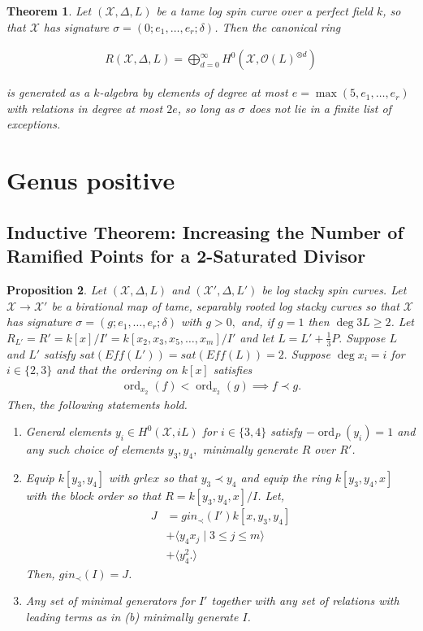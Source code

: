 \documentclass{amsart}
\theoremstyle{plain}
\newtheorem{thm}{Theorem}[section]
\newtheorem{prop}[thm]{Proposition}
\theoremstyle{definition}
\theoremstyle{remark}
\numberwithin{equation}{section}
\newcommand\ssec{\subsection}
\newcommand \sx{\mathscr X}
\newcommand\sco{{\mathscr O}}
\DeclareMathOperator{\ord}{ord}
\begin{document}
\begin{thm}
\label{thm:g_0_generators_relations_rep}
Let $(\sx, \Delta, L)$ be a tame log spin curve over a perfect field $k$, so
that $\sx$ has signature $\sigma = (0; e_1, \ldots, e_r; \delta)$. Then the
canonical ring

\begin{align*}
	R(\sx, \Delta, L) = \bigoplus_{d = 0}^\infty H^0(\sx, \sco(L)^{\otimes d})
\end{align*}

\noindent
is generated as a $k$-algebra by elements of degree at most $e = 
\max(5,e_1,\ldots, e_r)$ with relations in degree at most $2e$, so 
long as $\sigma$ does not lie in a finite list of exceptions. 
\end{thm}

\section{Genus positive}

\ssec{Inductive Theorem: Increasing the Number of Ramified Points for a 2-Saturated Divisor}

\begin{prop}
\label{prop:sat_two_induction}
Let $(\sx, \Delta, L)$ and $(\sx', \Delta, L')$ be log stacky spin curves. Let $\sx \rightarrow \sx'$ be a birational map of tame, separably rooted log stacky curves so that $\sx$ has signature $\sigma = (g;e_1,\ldots, e_r;\delta)$ with $g > 0,$ and, if $g = 1$ then $\deg 3L \geq 2$.
Let $R_{L'} = R' = k[x]/I'= k[x_2, x_3
, x_5,\ldots, x_m]/I'$ and let $L = L' + \frac{1}{
3}P.$ Suppose $L$ and $L'$ satisfy $sat(Eff(L')) = sat(Eff(L)) = 2.$ Suppose $\deg x_i = i$ for $i \in \{2, 3\}$ and that the ordering on $k[x]$ satisfies
\begin{align*}
	\ord_{x_2}(f) < \ord_{x_2}(g) \implies f \prec g.
\end{align*}
Then, the following statements hold.
\begin{enumerate}
	\item[(a)] General elements  $y_i \in H^0(\sx,iL)$ for $i \in \{3, 4\}$ satisfy $-\ord_P(y_i) = 1$ and any such choice of elements $y
		_3,y_4,$ minimally generate $R$ over $R'$.
	\item[(b)] Equip $k[y_3, y_4]$ with $grlex$ so that $y_3 \prec 
		y_4$
		and equip the ring $k[y_3, y_4, x]$ with the block 
		order so that $R = k[y_3, y_4, x]/I$. Let,
		\begin{align*}
			J &= gin_\prec(I')k[x, y_3, y_4] \\
			&+\langle y_4 x_j \mid 3 \leq j \leq m \rangle \\
			&+\langle y_4^2.\rangle
		\end{align*}
			Then, $gin_\prec(I) = J$.
	\item[(c)] Any set of minimal generators for $I'$ together with 
		any set of relations with leading terms as in (b) minimally 
		generate $I$.
\end{enumerate}
\end{prop}
\end{document}
